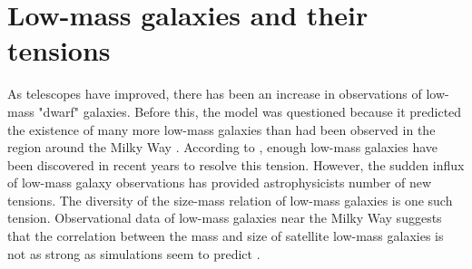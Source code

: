 \section{Low-mass galaxies and their tensions}

As telescopes have improved, there has been an increase in observations of low-mass "dwarf" galaxies. Before this, the \lcdm\* model was questioned because it predicted the existence of many more low-mass galaxies than had been observed in the region around the Milky Way \citep{klypinWhereAreMissing1999}. According to \cite{salesBaryonicSolutionsChallenges2022}, enough low-mass galaxies have been discovered in recent years to resolve this tension. However, the sudden influx of low-mass galaxy observations has provided astrophysicists number of new tensions. The diversity of the size-mass relation of low-mass galaxies is one such tension. Observational data of low-mass galaxies near the Milky Way suggests that the correlation between the mass and size of satellite low-mass galaxies is not as strong as simulations seem to predict \citep{salesBaryonicSolutionsChallenges2022}. 

